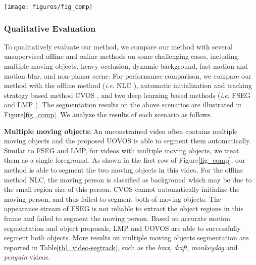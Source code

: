 \documentclass[journal]{IEEEtran}
\makeatletter
\newcommand{\ie}{\textit{i}.\textit{e}. }
\newcommand{\fig}{{Figure}\@\xspace}
\newcommand{\tab}{{Table}\@\xspace}
\makeatother
\begin{document}
\begin{figure*}[!t]
	\centerline{\texttt{[image: figures/fig\_comp]}}
	\caption
		{
		Comparison on several challenging cases, which include multiple moving objects, heavy occlusion, dynamic background, fast motion and motion blur, and non-planar motion. 
		The compared algorithms are NLC~\cite{BMVC2014_Faktor} (offline), CVOS~\cite{CVPR2015_Taylor}, FSEG~\cite{CVPR2017_Jain} and LMP~\cite{CVPR2017_Tokmakov}.
		}
	\label{fig_comp}
\end{figure*} 
\subsubsection{Qualitative Evaluation}
To qualitatively evaluate our method, 
we compare our method with several unsupervised offline and online methods on some challenging cases, 
including multiple moving objects, heavy occlusion, dynamic background, fast motion and motion blur, and non-planar scene.
For performance comparison, 
we compare our method with the offline method (\ie NLC \cite{BMVC2014_Faktor}), automatic initialization and tracking strategy based method CVOS \cite{CVPR2015_Taylor}, and two deep learning based methods (\ie FSEG \cite{CVPR2017_Jain} and LMP \cite{CVPR2017_Tokmakov}).
The segmentation results on the above scenarios are illustrated in \fig \ref{fig_comp}.
We analyze the results of each scenario as follows.

\textbf{Multiple moving objects:}
An unconstrained video often contains multiple moving objects and the proposed UOVOS is able to segment them automatically.
Similar to FSEG and LMP, 
for videos with multiple moving objects, we treat them as a single foreground.
As shown in the first row of \fig \ref{fig_comp},
our method is able to segment the two moving objects in this video.
For the offline method NLC,
the moving person is classified as background which may be due to the small region size of this person.
CVOS cannot automatically initialize the moving person, and thus failed to segment both of moving objects.
The appearance stream of FSEG is not reliable to extract the object regions in this frame and failed to segment the moving person.
Based on accurate motion segmentation and object proposals, 
LMP and UOVOS are able to successfully segment both objects.
More results on multiple moving objects segmentation are reported in \tab \ref{tbl_video-segtrack}, 
such as the \emph{bmx}, \emph{drift}, \emph{monkeydog} and \emph{penguin} videos.
\end{document}
